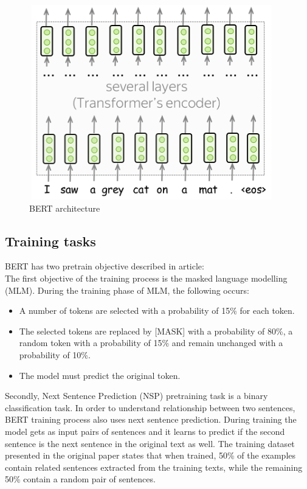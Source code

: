 \documentclass[PMI,VKR]{HSEUniversity}
\begin{document}
\begin{figure}[h]
    \centering
    \includegraphics[scale=0.8]{img/bert.png}
    \caption{BERT architecture}
\end{figure}


\subsection{Training tasks}
BERT has two pretrain objective described in article: \\
The first objective of the training process is the masked language modelling (MLM). 
During the training phase of MLM, the following occurs:

\begin{itemize}
    \item A number of tokens are selected with a probability of 15\% for each token.
    \item The selected tokens are replaced by [MASK] with a probability of 80\%, a random token with a probability of 15\% and remain unchanged with a probability of 10\%.
    \item The model must predict the original token.
\end{itemize}

Secondly, Next Sentence Prediction (NSP) pretraining task is a binary classification task. 
In order to understand relationship between two sentences, BERT training process also uses next sentence prediction.
During training the model gets as input pairs of sentences and it learns to predict if the second sentence is the next sentence in the original text as well. 
The training dataset presented in the original paper states that when trained, 50\% of the examples contain related sentences extracted from the training texts, while the remaining 50\% contain a random pair of sentences.
\end{document}
